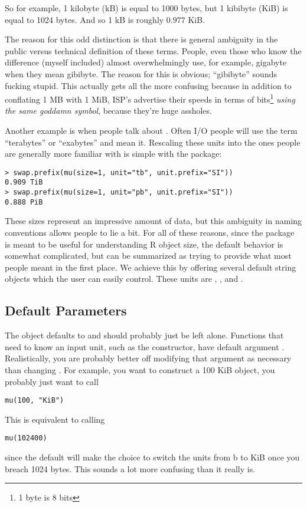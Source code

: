 So for example, 1 kilobyte (kB) is equal to 1000 bytes, but 1 kibibyte (KiB) is equal to 1024 bytes.  And so 1 kB is roughly $0.977$ KiB.

The reason for this odd distinction is that there is general ambiguity in the public versus technical definition of these terms.  People, even those who know the difference (myself included) almost overwhelmingly use, for example, gigabyte when they mean gibibyte.  The reason for this is obvious; ``gibibyte'' sounds fucking stupid.  This actually gets all the more confusing because in addition to conflating 1 MB with 1 MiB, ISP's advertise their speeds in terms of bits\footnote{1 byte is 8 bits} \emph{using the same goddamn symbol}, because they're huge assholes.

Another example is when people talk about .  Often I/O people will use the term ``terabytes'' or ``exabytes'' and mean it.  Rescaling these units into the ones people are generally more familiar with is simple with the  package:
\begin{lstlisting}[language=rr]
> swap.prefix(mu(size=1, unit="tb", unit.prefix="SI"))
0.909 TiB
> swap.prefix(mu(size=1, unit="pb", unit.prefix="SI"))
0.888 PiB
\end{lstlisting}

These sizes represent an impressive amount of data, but this ambiguity in naming conventions allows people to lie a bit.  For all of these reasons, since the package is meant to be useful for understanding R object size, the default behavior is somewhat complicated, but can be summarized as trying to provide what most people meant in the first place.  We achieve this by offering several default string objects which the user can easily control.  These units are , , and .  



\subsection{Default Parameters}

The  object defaults to  and should probably just be left alone.  Functions that need to know an input unit, such as the constructor, have default argument .  Realistically, you are probably better off modifying that argument as necessary than changing .  For example, you want to construct a 100 KiB  object, you probably just want to call
\begin{lstlisting}[language=rr]
mu(100, "KiB")
\end{lstlisting}
This is equivalent to calling
\begin{lstlisting}[language=rr]
mu(102400)
\end{lstlisting}
since the default  will make the choice to switch the units from b to KiB once you breach 1024 bytes.  This sounds a lot more confusing than it really is.


